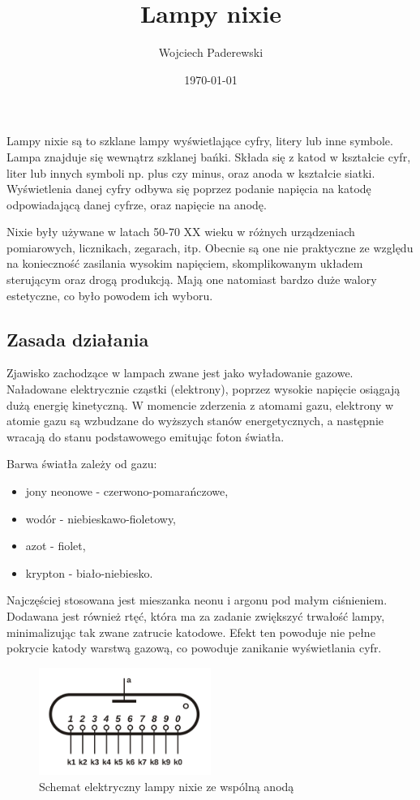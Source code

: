 \documentclass[../main.tex]{subfiles}
\author{Wojciech Paderewski}
\date{\today}
\title{Lampy nixie}
\begin{document}
Lampy nixie są to szklane lampy wyświetlające cyfry, litery lub inne symbole.
Lampa znajduje się wewnątrz szklanej bańki. Składa się z katod w kształcie cyfr, liter lub innych symboli np. plus czy minus, oraz anoda w kształcie siatki.
Wyświetlenia danej cyfry odbywa się poprzez podanie napięcia na katodę odpowiadającą danej cyfrze, oraz napięcie na anodę.

Nixie były używane w latach 50-70 XX wieku w różnych urządzeniach pomiarowych, licznikach, zegarach, itp. 
Obecnie są one nie praktyczne ze względu na konieczność zasilania wysokim napięciem, skomplikowanym układem sterującym oraz drogą produkcją.
Mają one natomiast bardzo duże walory estetyczne, co było powodem ich wyboru.

\subsection{Zasada działania}
Zjawisko zachodzące w lampach zwane jest jako wyładowanie gazowe.\cite{st:nixie}
Naładowane elektrycznie cząstki (elektrony), poprzez wysokie napięcie osiągają dużą energię kinetyczną.
W momencie zderzenia z atomami gazu, elektrony w atomie gazu są wzbudzane do wyższych stanów energetycznych, a następnie wracają do stanu podstawowego emitując foton światła.

Barwa światła zależy od gazu:
\begin{itemize}
  \item jony neonowe - czerwono-pomarańczowe,
  \item wodór - niebieskawo-fioletowy,
  \item azot - fiolet,
  \item krypton - biało-niebiesko.
\end{itemize}

Najczęściej stosowana jest mieszanka neonu i argonu pod małym ciśnieniem. Dodawana jest również rtęć, która ma za zadanie zwiększyć trwałość lampy, 
minimalizując tak zwane zatrucie katodowe. Efekt ten powoduje nie pełne pokrycie katody warstwą gazową, co powoduje zanikanie wyświetlania cyfr.

\begin{figure}[H]
  \centering
  \includegraphics[width=0.5\textwidth]{Nixie_schematic.png}
  \caption{Schemat elektryczny lampy nixie ze wspólną anodą\cite{st:nixie-jpg}}
\end{figure}
\end{document}
